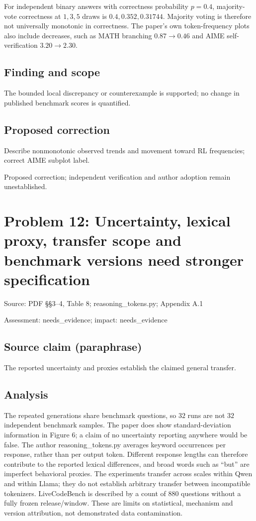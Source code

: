 \documentclass[11pt]{article}
\begin{document}
For independent binary answers with correctness probability \(p=0.4\), majority-vote correctness at \(1,3,5\) draws is \(0.4,0.352,0.31744\). Majority voting is therefore not universally monotonic in correctness. The paper's own token-frequency plots also include decreases, such as MATH branching \(0.87\to0.46\) and AIME self-verification \(3.20\to2.30\).

\subsection*{Finding and scope}

The bounded local discrepancy or counterexample is supported; no change in published benchmark scores is quantified.

\subsection*{Proposed correction}

Describe nonmonotonic observed trends and movement toward RL frequencies; correct AIME subplot label.

Proposed correction; independent verification and author adoption remain unestablished.

\section*{Problem 12: Uncertainty, lexical proxy, transfer scope and benchmark versions need stronger specification}

Source: PDF §§3–4, Table 8; reasoning\_tokens.py; Appendix A.1

Assessment: needs\_evidence; impact: needs\_evidence

\subsection*{Source claim (paraphrase)}

The reported uncertainty and proxies establish the claimed general transfer.

\subsection*{Analysis}

The repeated generations share benchmark questions, so \(32\) runs are not \(32\) independent benchmark samples. The paper does show standard-deviation information in Figure 6; a claim of no uncertainty reporting anywhere would be false. The author reasoning\_tokens.py averages keyword occurrences per response, rather than per output token. Different response lengths can therefore contribute to the reported lexical differences, and broad words such as “but” are imperfect behavioral proxies. The experiments transfer across scales within Qwen and within Llama; they do not establish arbitrary transfer between incompatible tokenizers. LiveCodeBench is described by a count of \(880\) questions without a fully frozen release/window. These are limits on statistical, mechanism and version attribution, not demonstrated data contamination.
\end{document}
